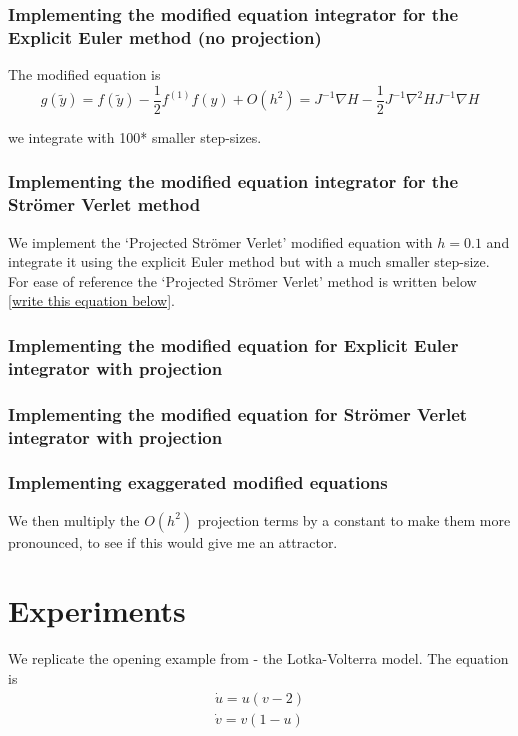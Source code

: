 \documentclass[12pt]{article}
\begin{document}

\subsubsection{Implementing the modified equation integrator for the Explicit Euler method (no projection)}
The modified equation is
$$g(\widetilde y) = f(\widetilde y) - \frac{1}{2}f^{(1)}f(y) + O(h^2) = J^{-1}\nabla H - \frac{1}{2}J^{-1}\nabla^2 H J^{-1}\nabla H$$

we integrate with 100* smaller step-sizes.


\subsubsection{Implementing the modified equation integrator for the Str\"omer Verlet method}
We implement the `Projected Str\"omer Verlet' modified equation with $h=0.1$ and integrate it using the explicit Euler method but with a much smaller step-size. For ease of reference the `Projected Str\"omer Verlet' method is written below \eqref{write this equation below}.

\subsubsection{Implementing the modified equation for Explicit Euler integrator with projection}

\subsubsection{Implementing the modified equation for Str\"omer Verlet integrator with projection}



\subsubsection{Implementing exaggerated modified equations}
We then multiply the $O(h^2)$ projection terms by a constant to make them more pronounced, to see if this would give me an attractor. 





\section{Experiments}
We replicate the opening example from \cite{Numerical} - the Lotka-Volterra model. The equation is 
\begin{equation}\label{eq:Lotka-Volterra}
    \begin{split}
        \dot u = u(v-2)\\
        \dot v = v(1-u)
    \end{split}
\end{equation}
\end{document}
